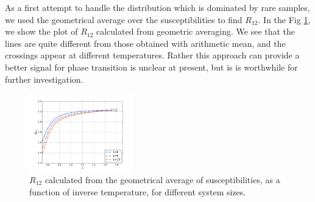 \documentclass[aps,prb,twocolumn,showpacs,superscriptaddress]{revtex4}
\begin{document}
As a first attempt to handle the distribution which is dominated by rare samples, 
we used the geometrical average \cite{PhysRevB.88.134204} over the susceptibilities to find $R_{12}$.
In the Fig \ref{fig:r12_gmean}, we show the plot of $R_{12}$ calculated from geometric averaging.
We see that the lines are quite different from those obtained with arithmetic 
mean, and the crossings appear at different temperatures. Rather this approach can 
provide a better signal for phase transition is unclear at present, but is is worthwhile 
for further investigation. 

\begin{figure}[ht]
  \centering
  \includegraphics[width=0.4\textwidth]{img/r12_gmean_h01.pdf}
\caption{\label{fig:r12_gmean} $R_{12}$ calculated from the geometrical average
of susceptibilities, 
as a function of inverse temperature, for different system sizes. 
}
\end{figure}
\end{document}
